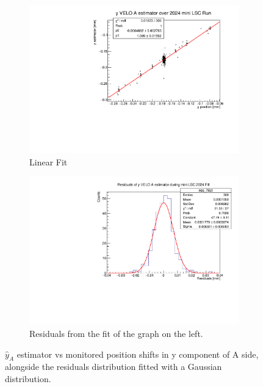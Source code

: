 \begin{figure}
    \centering
    \begin{subfigure}{0.48\textwidth}
    \includegraphics[width=\linewidth]{figures/yVeloA_fit_comparison.pdf}
    \caption{Linear Fit}\label{fig:yAfit_comparison}
    \end{subfigure}
    \begin{subfigure}{0.48\textwidth}
    \includegraphics[width=\linewidth]{figures/yVeloA_res_comparison.pdf}
    \caption{Residuals from the fit of the graph on the left. }\label{fig:yAres_comparison}
    \end{subfigure}
    \caption{$\hat{y}_{A}$ estimator vs monitored position shifts in y component of A side, alongside the residuals distribution fitted with a Gaussian distribution.}
    \label{fig:yA_comparison}
\end{figure}

